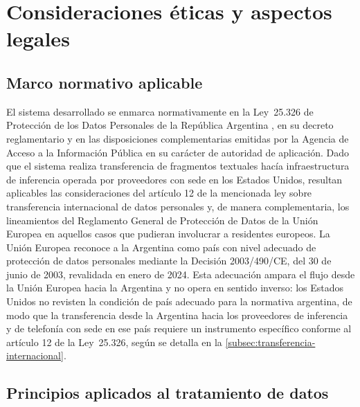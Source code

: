 \section{Consideraciones éticas y aspectos legales}\label{sec:aspectos-legales}

\subsection{Marco normativo aplicable}\label{subsec:marco-normativo}

El sistema desarrollado se enmarca normativamente en la Ley~25.326 de Protección de los Datos Personales de la República Argentina \parencite{Ley25326_2000}, en su decreto reglamentario y en las disposiciones complementarias emitidas por la Agencia de Acceso a la Información Pública en su carácter de autoridad de aplicación. Dado que el sistema realiza transferencia de fragmentos textuales hacía infraestructura de inferencia operada por proveedores con sede en los Estados Unidos, resultan aplicables las consideraciones del artículo 12 de la mencionada ley sobre transferencia internacional de datos personales y, de manera complementaria, los lineamientos del Reglamento General de Protección de Datos de la Unión Europea \parencite{GDPR2016} en aquellos casos que pudieran involucrar a residentes europeos. La Unión Europea reconoce a la Argentina como país con nivel adecuado de protección de datos personales mediante la Decisión 2003/490/CE, del 30 de junio de 2003, revalidada en enero de 2024. Esta adecuación ampara el flujo desde la Unión Europea hacia la Argentina y no opera en sentido inverso: los Estados Unidos no revisten la condición de país adecuado para la normativa argentina, de modo que la transferencia desde la Argentina hacia los proveedores de inferencia y de telefonía con sede en ese país requiere un instrumento específico conforme al artículo 12 de la Ley~25.326, según se detalla en la \autoref{subsec:transferencia-internacional}.

\subsection{Principios aplicados al tratamiento de datos}\label{subsec:principios-datos}

